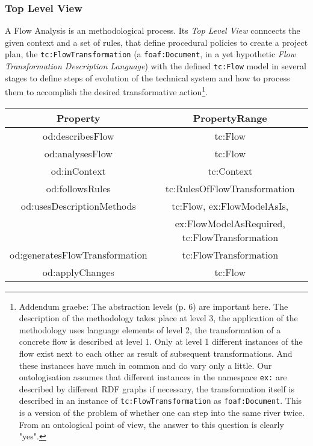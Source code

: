 \documentclass[a4paper,11pt]{article}
\begin{document}
\subsubsection{Top Level View}
A Flow Analysis is an methodological process. Its \emph{Top Level View}
conncects the given context and a set of rules, that define procedural
policies to create a project plan, the \texttt{tc:FlowTransformation} (a
\texttt{foaf:Document}, in a yet hypothetic \emph{Flow Transformation
  Description Language}) with the defined \texttt{tc:Flow} model in several
stages to define steps of evolution of the technical system and how to process
them to accomplish the desired transformative action\footnote{Addendum graebe:
  The abstraction levels (p. 6) are important here. The description of the
  methodology takes place at level 3, the application of the methodology uses
  language elements of level 2, the transformation of a concrete flow is
  described at level 1. Only at level 1 different instances of the flow exist
  next to each other as result of subsequent transformations.  And these
  instances have much in common and do vary only a little. Our ontologisation
  assumes that different instances in the namespace \texttt{ex:} are described
  by different RDF graphs if necessary, the transformation itself is described
  in an instance of \texttt{tc:FlowTransformation} as \texttt{foaf:Document}.
  This is a version of the problem of whether one can step into the same river
  twice. From an ontological point of view, the answer to this question is
  clearly "yes".}.

\begin{center}
\begin{tabular}{|c|c|}\hline
Property & PropertyRange \\\hline
od:describesFlow & tc:Flow \\
od:analysesFlow & tc:Flow \\
od:inContext & tc:Context \\
od:followsRules & tc:RulesOfFlowTransformation \\
od:usesDescriptionMethods & tc:Flow, ex:FlowModelAsIs, \\
& ex:FlowModelAsRequired, tc:FlowTransformation \\
od:generatesFlowTransformation & tc:FlowTransformation \\
od:applyChanges & tc:Flow \\\hline 
\end{tabular}
\end{center}
\end{document}
